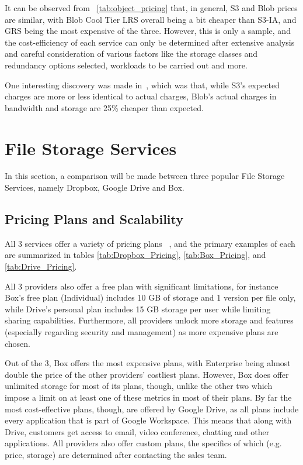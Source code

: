 It can be observed from ~\autoref{tab:object_pricing} that, in general, S3 and Blob prices are similar, with Blob Cool Tier LRS overall being a bit cheaper than S3-IA, and GRS being the most expensive of the three. However, this is only a sample, and the cost-efficiency of each service can only be determined after extensive analysis and careful consideration of various factors like the storage classes and redundancy options selected, workloads to be carried out and more.

One interesting discovery was made in~\cite{s3vsblob_performance}, which was that, while S3's expected charges are more or less identical to actual charges, Blob's actual charges in bandwidth and storage are 25\% cheaper than expected.

\section{File Storage Services}
In this section, a comparison will be made between three popular File Storage Services, namely Dropbox, Google Drive and Box.

\subsection{Pricing Plans and Scalability}
All 3 services offer a variety of pricing plans ~\cite{dropbox,google_drive,box}, and the primary examples of each are summarized in tables  \autoref{tab:Dropbox_Pricing}, \autoref{tab:Box_Pricing}, and \autoref{tab:Drive_Pricing}.

All 3 providers also offer a free plan with significant limitations, for instance Box's free plan (Individual) includes 10 GB of storage and 1 version per file only, while Drive's personal plan includes 15 GB storage per user while limiting sharing capabilities. Furthermore, all providers unlock more storage and features (especially regarding security and management) as more expensive plans are chosen.

Out of the 3, Box offers the most expensive plans, with Enterprise being almost double the price of the other providers' costliest plans. However, Box does offer unlimited storage for most of its plans, though, unlike the other two which impose a limit on at least one of these metrics in most of their plans.  By far the most cost-effective plans, though, are offered by Google Drive, as all plans include every application that is part of Google Workspace. This means that along with Drive, customers get access to email, video conference, chatting and other applications. All providers also offer custom plans, the specifics of which (e.g. price, storage) are determined after contacting the sales team.

